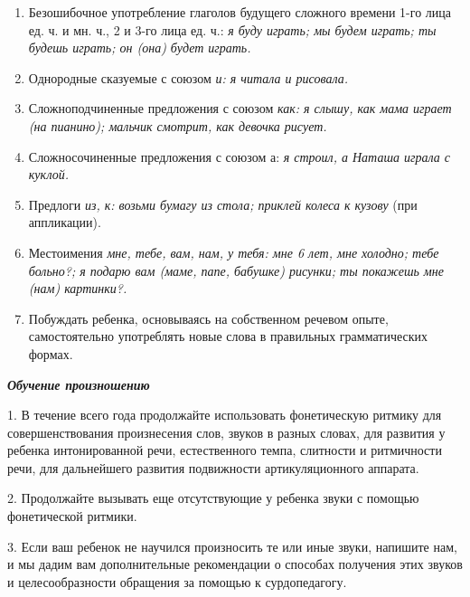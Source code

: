 \documentclass[a5paper]{book}
\renewcommand{\emph}[1]{\textit{#1}}
\begin{document}
\begin{enumerate}
\item
  
  Безошибочное употребление глаголов будущего сложного времени 1-го лица
  ед. ч. и мн. ч., 2 и 3-го лица ед. ч.: \emph{я буду играть; мы будем
  играть; ты будешь играть; он (она) будет играть.}
  
\item
  
  Однородные сказуемые с союзом \emph{и: я читала и рисовала.}
  
\item
  
  Сложноподчиненные предложения с союзом \emph{как: я слышу, как мама
  играет (на пианино); мальчик смотрит, как девочка рисует.}
  
\item
  
  Сложносочиненные предложения с союзом а: \emph{я строил, а Наташа
  играла с куклой.}
  
\item
  
  Предлоги \emph{из, к: возьми бумагу из стола; приклей колеса к кузову}
  (при аппликации).
  
\item
  
  Местоимения \emph{мне, тебе, вам, нам, у тебя: мне 6 лет, мне холодно;
  тебе больно?; я подарю вам (маме, папе, бабушке) рисунки; ты покажешь
  мне (нам) картинки?.}
  
\item
  
  Побуждать ребенка, основываясь на собственном речевом опыте,
  самостоятельно употреблять новые слова в правильных грамматических
  формах.
  
\end{enumerate}


\emph{\textbf{Обучение произношению}}

1. В течение всего года продолжайте использовать фонетическую ритмику
для совершенствования произнесения слов, звуков в разных словах, для
развития у ребенка интонированной речи, естественного темпа, слитности и
ритмичности речи, для дальнейшего развития подвижности артикуляционного
аппарата.

2. Продолжайте вызывать еще отсутствующие у ребенка звуки с помощью
фонетической ритмики.

3. Если ваш ребенок не научился произносить те или иные звуки, напишите
нам, и мы дадим вам дополнительные рекомендации о способах получения
этих звуков и целесообразности обращения за помощью к сурдопедагогу.
\end{document}
